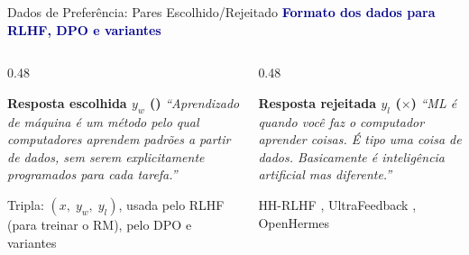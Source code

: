 \documentclass[aspectratio=169, xcolor=dvipsnames]{beamer}
\begin{document}
  \begin{frame}{Dados de Preferência: Pares Escolhido/Rejeitado}
    \centering
    \textcolor{DarkBlue}{\textbf{Formato dos dados para RLHF, DPO e variantes}}
    \vspace{0.5em}


    \vspace{0.5em}
    \begin{columns}[T]
      \begin{column}{0.48\textwidth}
        \begin{block}{\textbf{Resposta escolhida $y_w$ (\checkmark)}}
          \textit{``Aprendizado de máquina é um método pelo qual computadores
          aprendem padrões a partir de dados, sem serem explicitamente
          programados para cada tarefa.''}
        \end{block}
        \vspace{0.3em}
        \centering\small Tripla: $(x,\; y_w,\; y_l)$, usada pelo RLHF (para treinar o RM), pelo DPO e variantes
      \end{column}
      \begin{column}{0.48\textwidth}
        \begin{block}{\textbf{Resposta rejeitada $y_l$ ($\times$)}}
          \textit{``ML é quando você faz o computador aprender coisas.
          É tipo uma coisa de dados. Basicamente é inteligência artificial
          mas diferente.''}
        \end{block}
        \vspace{0.3em}
        \centering\small\textcolor{MidGray}{HH-RLHF \cite{bai2022hhrlhf},
        UltraFeedback \cite{cui2024ultrafeedback}, OpenHermes}
      \end{column}
    \end{columns}
\end{frame}
\end{document}
